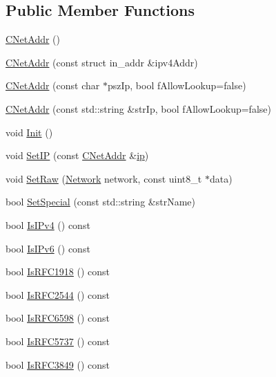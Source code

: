 \subsection*{Public Member Functions}
\begin{DoxyCompactItemize}
\item 
\hyperlink{class_c_net_addr_ad997a7ab057fbeab1dd6601135f8e02d}{C\+Net\+Addr} ()
\item 
\hyperlink{class_c_net_addr_a0af492cd8aca9bbaa3392cdbfbb55681}{C\+Net\+Addr} (const struct in\+\_\+addr \&ipv4\+Addr)
\item 
\hyperlink{class_c_net_addr_a3549332f92d95ccadf262bdce9f4eacf}{C\+Net\+Addr} (const char $\ast$psz\+Ip, bool f\+Allow\+Lookup=false)
\item 
\hyperlink{class_c_net_addr_ae237602be0e4bce6ff31061270371144}{C\+Net\+Addr} (const std\+::string \&str\+Ip, bool f\+Allow\+Lookup=false)
\item 
void \hyperlink{class_c_net_addr_adab412fbc5a9203bea90ae173996ab10}{Init} ()
\item 
void \hyperlink{class_c_net_addr_a1c6087345e5ca07a151451cd6deb974f}{Set\+I\+P} (const \hyperlink{class_c_net_addr}{C\+Net\+Addr} \&\hyperlink{class_c_net_addr_acff7ce68f33f8dfbfe6d79d80928d417}{ip})
\item 
void \hyperlink{class_c_net_addr_a1f0b23aca4ca78c11735d13f3583b7ad}{Set\+Raw} (\hyperlink{netbase_8h_acc9a38c714afe79b5035cb36f560dac3}{Network} network, const uint8\+\_\+t $\ast$data)
\item 
bool \hyperlink{class_c_net_addr_aa3e44dfd064d9d8da1cb48cdcb7dd231}{Set\+Special} (const std\+::string \&str\+Name)
\item 
bool \hyperlink{class_c_net_addr_a16ff4478f02f06f5a9a038a24d5da2f9}{Is\+I\+Pv4} () const 
\item 
bool \hyperlink{class_c_net_addr_a0edb022cd6a186de8099799415409d57}{Is\+I\+Pv6} () const 
\item 
bool \hyperlink{class_c_net_addr_a81b190a7e0b05b93bf3097ba43e5cec1}{Is\+R\+F\+C1918} () const 
\item 
bool \hyperlink{class_c_net_addr_a7879f3a079c815c2e2b7fc3cd7f65d3a}{Is\+R\+F\+C2544} () const 
\item 
bool \hyperlink{class_c_net_addr_a9df45c643f24325e9a4749e2f5caad21}{Is\+R\+F\+C6598} () const 
\item 
bool \hyperlink{class_c_net_addr_a1ea17f90b788e435dc303f57874c1fdf}{Is\+R\+F\+C5737} () const 
\item 
bool \hyperlink{class_c_net_addr_a639dff0ffea6ad930353784686def39b}{Is\+R\+F\+C3849} () const 

\end{DoxyCompactItemize}
